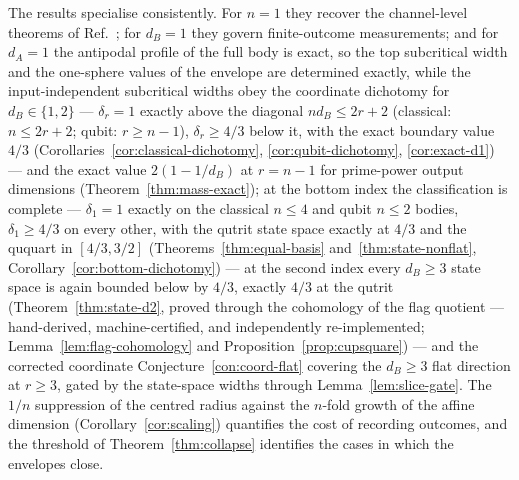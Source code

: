 \documentclass[11pt,a4paper]{article}
\begin{document}
The results specialise consistently. For $n=1$ they recover the channel-level theorems of Ref.~\cite{CompanionChannels}; for $d_B=1$ they govern finite-outcome measurements; and for $d_A=1$ the antipodal profile of the full body is exact, so the top subcritical width and the one-sphere values of the envelope are determined exactly, while the input-independent subcritical widths obey the coordinate dichotomy for $d_B\in\{1,2\}$ --- $\delta_r=1$ exactly above the diagonal $nd_B\le2r+2$ (classical: $n\le2r+2$; qubit: $r\ge n-1$), $\delta_r\ge4/3$ below it, with the exact boundary value $4/3$ (Corollaries~\ref{cor:classical-dichotomy}, \ref{cor:qubit-dichotomy}, \ref{cor:exact-d1}) --- and the exact value $2(1-1/d_B)$ at $r=n-1$ for prime-power output dimensions (Theorem~\ref{thm:mass-exact}); at the bottom index the classification is complete --- $\delta_1=1$ exactly on the classical $n\le4$ and qubit $n\le2$ bodies, $\delta_1\ge4/3$ on every other, with the qutrit state space exactly at $4/3$ and the ququart in $[4/3,3/2]$ (Theorems~\ref{thm:equal-basis} and~\ref{thm:state-nonflat}, Corollary~\ref{cor:bottom-dichotomy}) --- at the second index every $d_B\ge3$ state space is again bounded below by $4/3$, exactly $4/3$ at the qutrit (Theorem~\ref{thm:state-d2}, proved through the cohomology of the flag quotient --- hand-derived, machine-certified, and independently re-implemented; Lemma~\ref{lem:flag-cohomology} and Proposition~\ref{prop:cupsquare}) --- and the corrected coordinate Conjecture~\ref{con:coord-flat} covering the $d_B\ge3$ flat direction at $r\ge3$, gated by the state-space widths through Lemma~\ref{lem:slice-gate}. The $1/n$ suppression of the centred radius against the $n$-fold growth of the affine dimension (Corollary~\ref{cor:scaling}) quantifies the cost of recording outcomes, and the threshold of Theorem~\ref{thm:collapse} identifies the cases in which the envelopes close.
\end{document}
